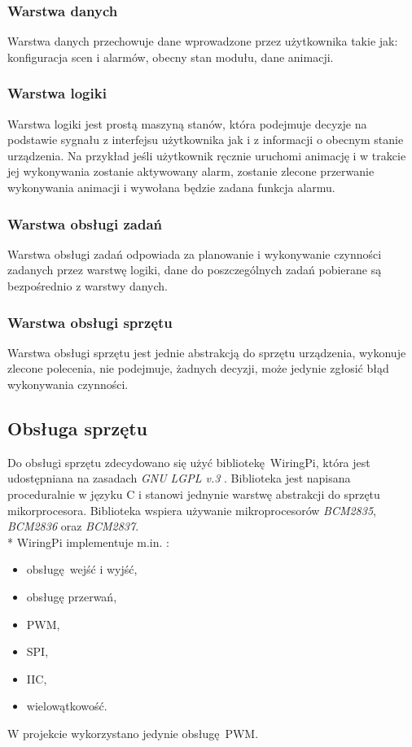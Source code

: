 \documentclass[12pt, eng, twoside, openany, final]{mgr}
\begin{document}
                \subsubsection{Warstwa danych}
                Warstwa danych przechowuje dane wprowadzone przez użytkownika takie jak: konfiguracja scen i alarmów, obecny stan modułu, dane animacji.  
                
                \subsubsection{Warstwa logiki}
                Warstwa logiki jest prostą maszyną stanów, która podejmuje decyzje na podstawie sygnału z interfejsu użytkownika jak i z informacji o obecnym stanie urządzenia. Na przykład jeśli użytkownik ręcznie uruchomi animację i w trakcie jej wykonywania zostanie aktywowany alarm, zostanie zlecone przerwanie wykonywania animacji i wywołana będzie zadana funkcja alarmu.
                
                \subsubsection{Warstwa obsługi zadań}
                Warstwa obsługi zadań odpowiada za planowanie i wykonywanie czynności zadanych przez warstwę logiki, dane do poszczególnych zadań pobierane są bezpośrednio z warstwy danych.
                
                \subsubsection{Warstwa obsługi sprzętu}
                Warstwa obsługi sprzętu jest jednie abstrakcją do sprzętu urządzenia, wykonuje zlecone polecenia, nie podejmuje, żadnych decyzji, może jedynie zgłosić błąd wykonywania czynności.
                
                    \newpage
                \subsection{Obsługa sprzętu}
                Do obsługi sprzętu zdecydowano się użyć bibliotekę WiringPi, która jest udostępniana na zasadach \emph{GNU LGPL v.3 }. Biblioteka jest napisana proceduralnie w języku C i stanowi jednynie warstwę abstrakcji do sprzętu mikorprocesora. Biblioteka wspiera używanie mikroprocesorów \emph{BCM2835}, \emph{BCM2836} oraz  \emph{BCM2837}. \\*
                WiringPi implementuje m.in. : 
                \begin{itemize}
                    \item obsługę wejść i wyjść,
                    \item obsługę przerwań,
                    \item PWM,
                    \item SPI,
                    \item IIC,
                    \item wielowątkowość.
                \end{itemize}
                W projekcie wykorzystano jedynie obsługę PWM.
                
\end{document}
